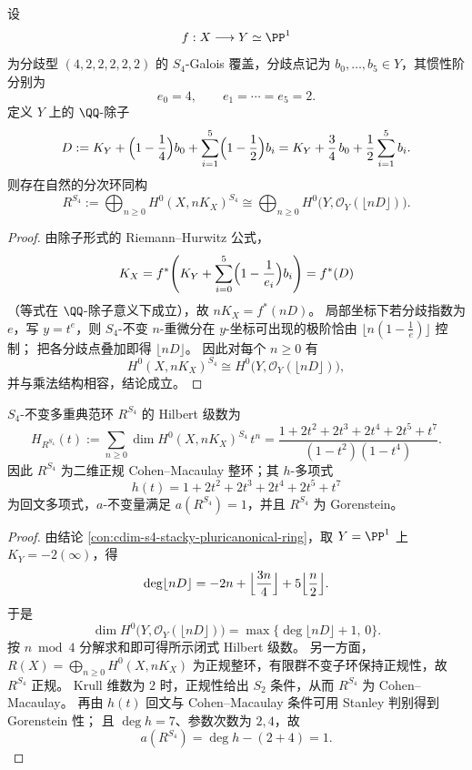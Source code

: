 \begin{conclusion}\label{con:cdim-s4-stacky-pluricanonical-ring}
设
\[
f:X\longrightarrow Y\simeq\PP^1
\]
为分歧型 \((4,2,2,2,2,2)\) 的 \(S_4\)-Galois 覆盖，分歧点记为 \(b_0,\dots,b_5\in Y\)，其惯性阶分别为
\[
e_0=4,\qquad e_1=\cdots=e_5=2.
\]
定义 \(Y\) 上的 \(\QQ\)-除子
\[
D
:=
K_Y+\Bigl(1-\frac14\Bigr)b_0+\sum_{i=1}^5\Bigl(1-\frac12\Bigr)b_i
=
K_Y+\frac34\,b_0+\frac12\sum_{i=1}^5 b_i.
\]
则存在自然的分次环同构
\[
R^{S_4}
:=
\bigoplus_{n\ge 0}H^0(X,nK_X)^{S_4}
\cong
\bigoplus_{n\ge 0}H^0\!\bigl(Y,\mathcal O_Y(\lfloor nD\rfloor)\bigr).
\]
\end{conclusion}
\begin{proof}
由除子形式的 Riemann--Hurwitz 公式，
\[
K_X=f^*\!\left(K_Y+\sum_{i=0}^5\Bigl(1-\frac1{e_i}\Bigr)b_i\right)=f^*(D)
\]
（等式在 \(\QQ\)-除子意义下成立），故 \(nK_X=f^*(nD)\)。
局部坐标下若分歧指数为 \(e\)，写 \(y=t^e\)，则 \(S_4\)-不变 \(n\)-重微分在 \(y\)-坐标可出现的极阶恰由 \(\lfloor n(1-\tfrac1e)\rfloor\) 控制；
把各分歧点叠加即得 \(\lfloor nD\rfloor\)。
因此对每个 \(n\ge 0\) 有
\[
H^0(X,nK_X)^{S_4}\cong H^0\!\bigl(Y,\mathcal O_Y(\lfloor nD\rfloor)\bigr),
\]
并与乘法结构相容，结论成立。
\end{proof}

\begin{conclusion}\label{con:cdim-s4-hilbert-a-gorenstein}
\(S_4\)-不变多重典范环 \(R^{S_4}\) 的 Hilbert 级数为
\[
H_{R^{S_4}}(t)
:=
\sum_{n\ge0}\dim H^0(X,nK_X)^{S_4}\,t^n
=
\frac{1+2t^2+2t^3+2t^4+2t^5+t^7}{(1-t^2)(1-t^4)}.
\]
因此 \(R^{S_4}\) 为二维正规 Cohen--Macaulay 整环；其 \(h\)-多项式
\[
h(t)=1+2t^2+2t^3+2t^4+2t^5+t^7
\]
为回文多项式，\(a\)-不变量满足 \(a(R^{S_4})=1\)，并且 \(R^{S_4}\) 为 Gorenstein。
\end{conclusion}
\begin{proof}
由结论 \ref{con:cdim-s4-stacky-pluricanonical-ring}，取 \(Y=\PP^1\) 上 \(K_Y=-2(\infty)\)，得
\[
\deg\lfloor nD\rfloor
=
-2n+\Bigl\lfloor\frac{3n}{4}\Bigr\rfloor+5\Bigl\lfloor\frac{n}{2}\Bigr\rfloor.
\]
于是
\[
\dim H^0\!\bigl(Y,\mathcal O_Y(\lfloor nD\rfloor)\bigr)
=
\max\!\bigl\{\deg\lfloor nD\rfloor+1,\,0\bigr\}.
\]
按 \(n\bmod 4\) 分解求和即可得所示闭式 Hilbert 级数。
另一方面，\(R(X)=\bigoplus_{n\ge0}H^0(X,nK_X)\) 为正规整环，有限群不变子环保持正规性，故 \(R^{S_4}\) 正规。
Krull 维数为 \(2\) 时，正规性给出 \(S_2\) 条件，从而 \(R^{S_4}\) 为 Cohen--Macaulay。
再由 \(h(t)\) 回文与 Cohen--Macaulay 条件可用 Stanley 判别得到 Gorenstein 性；
且 \(\deg h=7\)、参数次数为 \(2,4\)，故
\[
a(R^{S_4})=\deg h-(2+4)=1.
\]
\end{proof}

